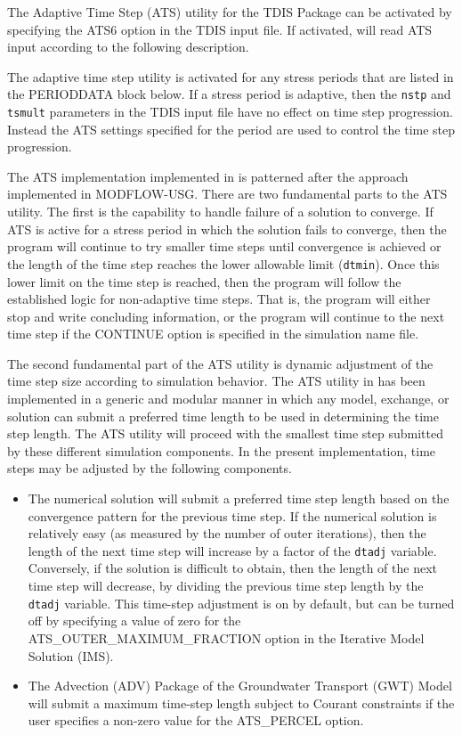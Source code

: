The Adaptive Time Step (ATS) utility for the TDIS Package can be activated by specifying the ATS6 option in the TDIS input file.  If activated, \mf will read ATS input according to the following description.

The adaptive time step utility is activated for any stress periods that are listed in the PERIODDATA block below.  If a stress period is adaptive, then the \texttt{nstp} and \texttt{tsmult} parameters in the TDIS input file have no effect on time step progression.  Instead the ATS settings specified for the period are used to control the time step progression.

The ATS implementation implemented in \mf is patterned after the approach implemented in MODFLOW-USG.  There are two fundamental parts to the ATS utility.  The first is the capability to handle failure of a solution to converge.  If ATS is active for a stress period in which the solution fails to converge, then the program will continue to try smaller time steps until convergence is achieved or the length of the time step reaches the lower allowable limit (\texttt{dtmin}).  Once this lower limit on the time step is reached, then the program will follow the established logic for non-adaptive time steps.  That is, the program will either stop and write concluding information, or the program will continue to the next time step if the CONTINUE option is specified in the simulation name file.

The second fundamental part of the ATS utility is dynamic adjustment of the time step size according to simulation behavior.  The ATS utility in \mf has been implemented in a generic and modular manner in which any model, exchange, or solution can submit a preferred time length to be used in determining the time step length.  The ATS utility will proceed with the smallest time step submitted by these different simulation components.  In the present implementation, time steps may be adjusted by the following components.

\begin{itemize}
\item The numerical solution will submit a preferred time step length based on the convergence pattern for the previous time step.  If the numerical solution is relatively easy (as measured by the number of outer iterations), then the length of the next time step will increase by a factor of the \texttt{dtadj} variable.  Conversely, if the solution is difficult to obtain, then the length of the next time step will decrease, by dividing the previous time step length by the \texttt{dtadj} variable.  This time-step adjustment is on by default, but can be turned off by specifying a value of zero for the ATS\_OUTER\_MAXIMUM\_FRACTION option in the Iterative Model Solution (IMS).

\item The Advection (ADV) Package of the Groundwater Transport (GWT) Model will submit a maximum time-step length subject to Courant constraints if the user specifies a non-zero value for the ATS\_PERCEL option.
\end{itemize}


